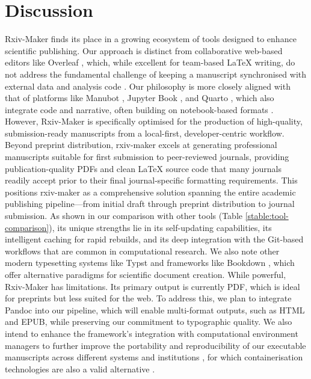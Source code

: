 \documentclass[times, twoside]{rxiv_maker_style}
\begin{document}
\section*{Discussion}
Rxiv-Maker finds its place in a growing ecosystem of tools designed to enhance scientific publishing. Our approach is distinct from collaborative web-based editors like Overleaf \cite{Overleaf2024}, which, while excellent for team-based LaTeX writing, do not address the fundamental challenge of keeping a manuscript synchronised with external data and analysis code \cite{HenriquesLab2015_template}. Our philosophy is more closely aligned with that of platforms like Manubot \cite{himmelstein2019}, Jupyter Book \cite{JupyterBook2020}, and Quarto \cite{Quarto2024}, which also integrate code and narrative, often building on notebook-based formats \cite{Jupyter2016_notebook}. However, Rxiv-Maker is specifically optimised for the production of high-quality, submission-ready manuscripts from a local-first, developer-centric workflow. Beyond preprint distribution, rxiv-maker excels at generating professional manuscripts suitable for first submission to peer-reviewed journals, providing publication-quality PDFs and clean LaTeX source code that many journals readily accept prior to their final journal-specific formatting requirements. This positions rxiv-maker as a comprehensive solution spanning the entire academic publishing pipeline—from initial draft through preprint distribution to journal submission. As shown in our comparison with other tools (Table \ref{stable:tool-comparison}), its unique strengths lie in its self-updating capabilities, its intelligent caching for rapid rebuilds, and its deep integration with the Git-based workflows that are common in computational research. We also note other modern typesetting systems like Typst \cite{Typst2024} and frameworks like Bookdown \cite{Xie2016_bookdown}, which offer alternative paradigms for scientific document creation.
While powerful, Rxiv-Maker has limitations. Its primary output is currently PDF, which is ideal for preprints but less suited for the web. To address this, we plan to integrate Pandoc \cite{pandoc2020} into our pipeline, which will enable multi-format outputs, such as HTML and EPUB, while preserving our commitment to typographic quality. We also intend to enhance the framework's integration with computational environment managers to further improve the portability and reproducibility of our executable manuscripts across different systems and institutions \cite{biaflows2024,dl4miceverywhere2024}, for which containerisation technologies are also a valid alternative \cite{Boettiger2015_docker_reproducibility,gomes2018}.
\end{document}
